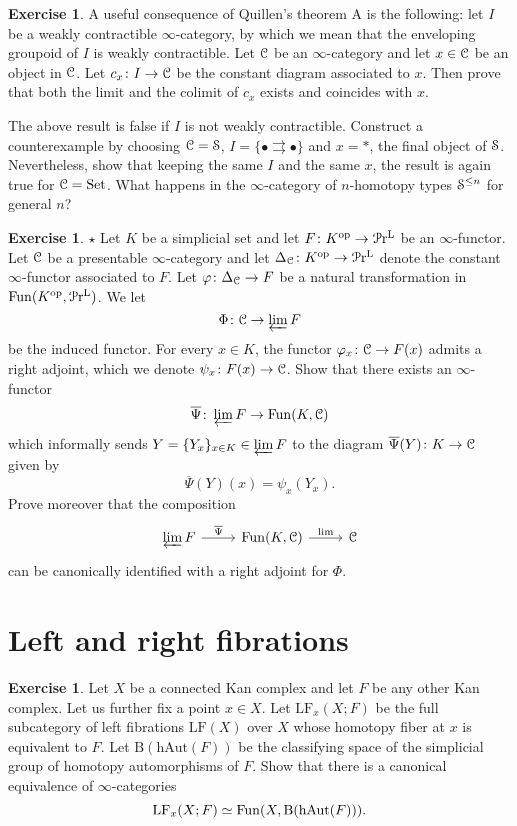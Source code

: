 \documentclass[10pt,a4paper,reqno,oneside]{book} %
\theoremstyle{plain}
\theoremstyle{definition}
\newtheorem{exercise}[thm]{Exercise}
\theoremstyle{remark}
\numberwithin{equation}{section}
\begin{document}
\begin{exercise}
	A useful consequence of Quillen's theorem A is the following: let $I$ be a weakly contractible $\infty$-category, by which we mean that the enveloping groupoid of $I$ is weakly contractible. Let $\mathcal C$ be an $\infty$-category and let $x \in \mathcal C$ be an object in $\mathcal C$.
	Let $c_x \colon I \to \mathcal C$ be the constant diagram associated to $x$.
	Then prove that both the limit and the colimit of $c_x$ exists and coincides with $x$.
	
	The above result is false if $I$ is not weakly contractible. Construct a counterexample by choosing $\mathcal C = \mathcal S$, $I = \{\bullet \rightrightarrows \bullet\}$ and $x = *$, the final object of $\mathcal S$. Nevertheless, show that keeping the same $I$ and the same $x$, the result is again true for $\mathcal C = \mathrm{Set}$. What happens in the $\infty$-category of $n$-homotopy types $\mathcal S^{\le n}$ for general $n$?
\end{exercise}

\begin{exercise}
	$\star$ Let $K$ be a simplicial set and let $F \colon K^\mathrm{op} \to \mathcal{P}\mathrm{r}^\mathrm L$ be an $\infty$-functor.
	Let $\mathcal C$ be a presentable $\infty$-category and let $\Delta_\mathcal C \colon K^\mathrm{op} \to \mathcal{P}\mathrm{r}^\mathrm L$ denote the constant $\infty$-functor associated to $F$.
	Let $\varphi \colon \Delta_\mathcal C \to F$ be a natural transformation in $\operatorname{Fun}(K^\mathrm{op}, \mathcal{P}\mathrm{r}^\mathrm L)$.
	We let
	\[ \Phi \colon \mathcal C \to \varprojlim F \]
	be the induced functor.
	For every $x \in K$, the functor $\varphi_x \colon \mathcal C \to F(x)$ admits a right adjoint, which we denote $\psi_x \colon F(x) \to \mathcal C$.
	Show that there exists an $\infty$-functor
	\[ \overline{\Psi} \colon \varprojlim F \to \operatorname{Fun}(K, \mathcal C) \]
	which informally sends $Y = \{Y_x\}_{x \in K} \in \varprojlim F$ to the diagram $\overline{\Psi}(Y) \colon K \to \mathcal C$ given by
	\[ \overline{\Psi}(Y)(x) = \psi_x(Y_x) . \]
	Prove moreover that the composition
	\[ \begin{tikzcd}
		\varprojlim F \arrow{r}{\overline{\Psi}} & \Fun(K, \cC) \arrow{r}{\mathrm{lim}} & \cC
	\end{tikzcd} \]
	can be canonically identified with a right adjoint for $\Phi$.
\end{exercise}

\section{Left and right fibrations}

\begin{exercise}
	Let $X$ be a connected Kan complex and let $F$ be any other Kan complex.
	Let us further fix a point $x \in X$.
	Let $\mathrm{LF}_x(X;F)$ be the full subcategory of left fibrations $\mathrm{LF}(X)$ over $X$ whose homotopy fiber at $x$ is equivalent to $F$.
	Let $\mathrm{B}(\mathrm{hAut}(F))$ be the classifying space of the simplicial group of homotopy automorphisms of $F$.
	Show that there is a canonical equivalence of $\infty$-categories
	\[ \mathrm{LF}_x(X;F) \simeq \operatorname{Fun}(X, \mathrm{B}(\mathrm{hAut}(F))) . \]
\end{exercise}
\end{document}
